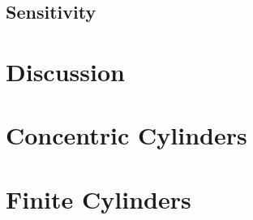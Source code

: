 \documentclass[prd,longbibliography,nofootinbib]{revtex4-2}
\begin{document}
\subsection{Sensitivity}

\section{Discussion}



\begin{appendices}

\section{Concentric Cylinders}

\section{Finite Cylinders}
\label{ap:finite}

\end{appendices}
\end{document}
